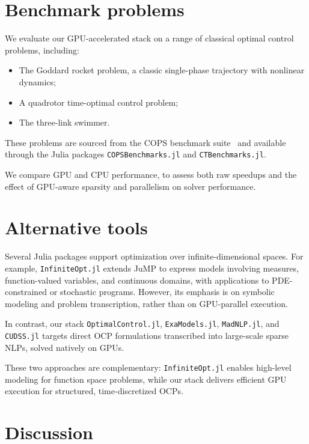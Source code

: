 \documentclass[twoside,leqno,twocolumn]{article}
\begin{document}
\section{Benchmark problems}

We evaluate our GPU-accelerated stack on a range of classical optimal control problems, including:

\begin{itemize}
    \item The Goddard rocket problem, a classic single-phase trajectory with nonlinear dynamics;
    \item A quadrotor time-optimal control problem;
    \item The three-link swimmer.
\end{itemize}

These problems are sourced from the COPS benchmark suite~\cite{bondarenko2000cops} and available through the Julia packages \texttt{COPSBenchmarks.jl} and \texttt{CTBenchmarks.jl}.

We compare GPU and CPU performance,
to assess both raw speedups and the effect of GPU-aware sparsity and parallelism on solver performance.

\section{Alternative tools}

Several Julia packages support optimization over infinite-dimensional spaces.  
For example, \texttt{InfiniteOpt.jl} extends JuMP to express models involving measures, function-valued variables, and continuous domains, with applications to PDE-constrained or stochastic programs.  
However, its emphasis is on symbolic modeling and problem transcription, rather than on GPU-parallel execution.

In contrast, our stack \texttt{OptimalControl.jl}, \texttt{ExaModels.jl}, \texttt{MadNLP.jl}, and \texttt{CUDSS.jl} targets direct OCP formulations transcribed into large-scale sparse NLPs, solved natively on GPUs.

These two approaches are complementary: \texttt{InfiniteOpt.jl} enables high-level modeling for function space problems, while our stack delivers efficient GPU execution for structured, time-discretized OCPs.

\section{Discussion}
\end{document}
